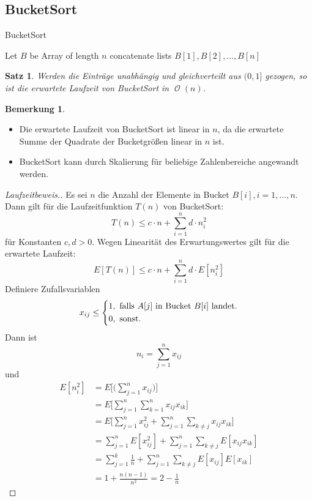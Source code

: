 \documentclass[a4paper,12pt]{article}
\DeclareMathOperator{\BigO}{\mathcal O}
\newtheorem{satz}[axiom]{Satz}
\theoremstyle{definition}
\newtheorem*{bemerkung}{Bemerkung}
\begin{document}
	\subsection{BucketSort}
	\begin{algorithm}[H]
		\caption{BucketSort}
		\KwIn{Array $A$ der Länge $n$ mit Einträgen $A[i] \in (0, 1]$}
		Let $B$ be Array of length $n$
		concatenate lists $B[1], B[2], \ldots, B[n]$
	\end{algorithm}
	\begin{satz}
		Werden die Einträge unabhängig und gleichverteilt aus $(0, 1]$ gezogen, so ist die erwartete Laufzeit von BucketSort in $\BigO(n)$.
	\end{satz}
	\begin{bemerkung}
		\begin{itemize}
			\item Die erwartete Laufzeit von BucketSort ist linear in $n$, da die erwartete Summe der Quadrate der Bucketgrößen linear in $n$ ist.
			\item BucketSort kann durch Skalierung für beliebige Zahlenbereiche angewandt werden.
		\end{itemize}
	\end{bemerkung}
	\begin{proof}[Laufzeitbeweis.]
		Es sei $n$ die Anzahl der Elemente in Bucket $B[i], i = 1, \ldots, n$. Dann gilt für die Laufzeitfunktion $T(n)$ von BucketSort:
		\[
			T(n) \leq c \cdot n + \sum_{i = 1}^{n} d \cdot n_i^2
		\]
		für Konstanten $c, d > 0$. Wegen Linearität des Erwartungswertes gilt für die erwartete Laufzeit:
		\[
			E[T(n)] \leq c \cdot n + \sum_{i = 1}^{n} d \cdot E[n_i^2]
		\]
		Definiere Zufallsvariablen
		\[
			x_{ij} \leq \begin{dcases*}
				1, \text{ falls $A[j]$ in Bucket $B[i]$ landet.}\\
				0, \text{ sonst.}
			\end{dcases*}
		\]
		Dann ist 
		\[
			n_i = \sum_{j = 1}^{n}x_{ij}
		\]
		und
		\begin{align*}
			E[n_i^2] &= E\Big[\Big(\sum_{j = 1}^{n}x_{ij}\Big)\Big]\\
			&= E\Big[\sum_{j = 1}^{n}\sum_{k = 1}^{n}x_{ij}x_{ik}\Big]\\
			&= E\Big[\sum_{j = 1}^{n}x_{ij}^2 + \sum_{j = 1}^{n}\sum_{k \neq j}^{}x_{ij}x_{ik}\Big]\\
			&= \sum_{j = 1}^{n}E[x_{ij}^2] + \sum_{j = 1}^{n}\sum_{k \neq j}^{}E[x_{ij}x_{ik}]\\
			&= \sum_{j = 1}^{k}\frac{1}{n} + \sum_{j = 1}^{n}\sum_{k \neq j}^{}E[x_{ij}]E[x_{ik}]\\
			&= 1 + \frac{n(n - 1)}{n^2} = 2 - \frac{1}{n}
		\end{align*}
	\end{proof}
\end{document}
